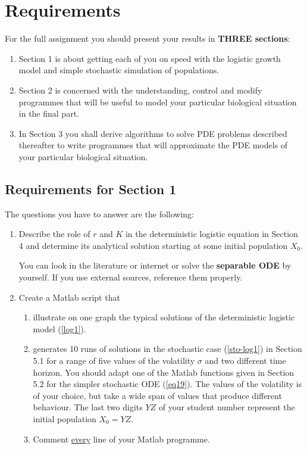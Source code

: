 \documentclass[12pt]{article}
\begin{document}
\newpage

\section{Requirements}

For the full assignment you should present your results in {\bf\magenta THREE sections}:
\begin{enumerate}\item Section 1 is about getting each of you on speed with the logistic growth model and
simple stochastic simulation of populations.
\item Section 2 is concerned with the understanding, control and modify programmes that will be useful
to model your particular biological situation in the final part.
\item In Section 3 you shall derive algorithms to solve PDE problems described thereafter
to write programmes that will
approximate the PDE models of your particular biological situation.  \end{enumerate}

\subsection{Requirements for Section 1}

The questions you have to answer are the following:
\begin{enumerate}\item Describe the role of $r$ and $K$ in the deterministic logistic equation in Section 4
and determine its analytical solution starting at some initial population $X_0$.

You can look in the literature or internet or solve the {\bf\magenta separable ODE} by yourself.
If you use external sources, reference them properly.
\item Create a Matlab script that
\begin{enumerate}\item illustrate on one graph the typical solutions of the deterministic logistic model (\ref{log1}).

\item generates 10 runs of solutions in the stochastic case (\ref{sto-log1}) in Section 5.1 for a range
of five values of the volatility $\sigma$ and two different time horizon.
You should adapt one of the Matlab functions given in Section 5.2
for the simpler stochastic ODE (\ref{eq19}).
The values of the volatility is of your choice, but take
a wide span of values that produce different behaviour. The last two digits $Y\!Z$ of your student number
represent the initial population $X_0=Y\!Z$.
\item Comment \underline{every} line of your Matlab programme. \end{enumerate}  \end{enumerate}
\end{document}
